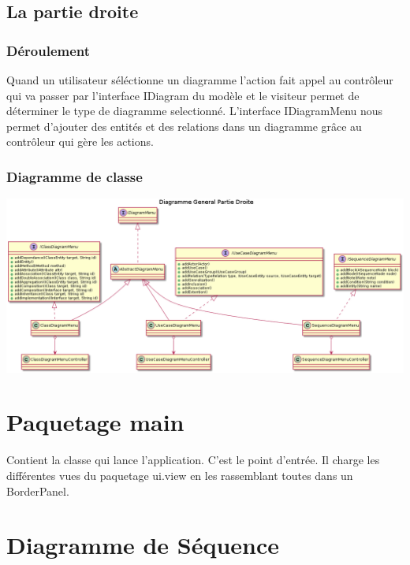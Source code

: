 \documentclass[a4paper,10pt]{article}
\begin{document}
  \subsection{La partie droite}
    \subsubsection{Déroulement}
      Quand un utilisateur séléctionne un diagramme l'action fait appel au contrôleur qui va passer par l'interface IDiagram du modèle et le visiteur 
      permet de déterminer le type de diagramme selectionné.
      L'interface IDiagramMenu nous permet d'ajouter des entités et des relations dans un diagramme grâce au contrôleur qui gère les actions.
       
    \subsubsection{Diagramme de classe} 
          \begin{center}
	     \includegraphics[width=15cm]{Image/DiagramGenrDroite.png}
          \end{center}
          
\section{Paquetage main}
    Contient la classe qui lance l'application. C'est le point d'entrée. Il charge les différentes vues du paquetage ui.view en les rassemblant toutes dans un BorderPanel.
    
\section{Diagramme de Séquence}
\end{document}
